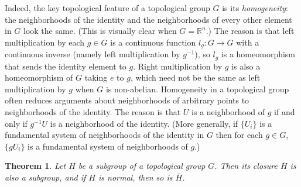 \documentclass[12pt]{report}
\newtheorem{theorem}{Theorem}[section]
\theoremstyle{definition}
\newcommand{\RR}{\mathbb{R}}
\begin{document}
Indeed, the key topological feature of a topological group $G$ is its \emph{homogeneity}: the neighborhoods of the identity and the neighborhoods of every other element in $G$ look the same. (This is visually clear when $G = \RR^n$.) The reason is that left multiplication by each $g \in G$ is a continuous function $l_g : G \to G$ with a continuous inverse (namely left multiplication by $g^{-1}$), so $l_g$ is a homeomorphism that sends the identity element to $g$. Right multiplication by $g$ is also a homeomorphism of $G$ taking $e$ to $g$, which need not be the same as left multiplication by $g$ when $G$ is non-abelian. Homogeneity in a topological group often reduces arguments about neighborhoods of arbitrary points to neighborhoods of the identity. The reason is that $U$ is a neighborhood of $g$ if and only if $g^{-1}U$ is a neighborhood of the identity. (More generally, if $\{U_i\}$ is a fundamental system of neighborhoods of the identity in $G$ then for each $g \in G$, $\{gU_i\}$ is a fundamental system of neighborhoods of $g$.)

\begin{theorem}
	Let $H$ be a subgroup of a topological group $G$. Then its closure $\overline{H}$ is also a subgroup, and if $H$ is normal, then so is $\overline{H}$.
\end{theorem}
\end{document}
